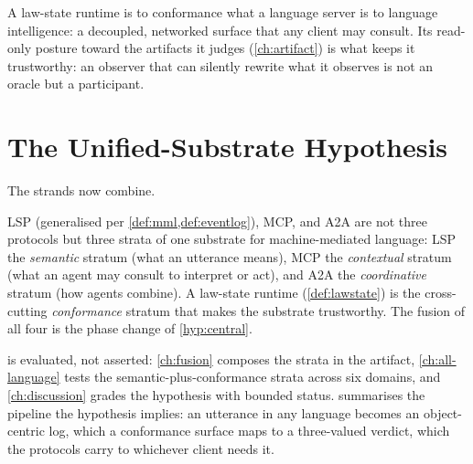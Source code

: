 A law-state runtime is to conformance what a language server is to language
intelligence: a decoupled, networked surface that any client may consult. Its
read-only posture toward the artifacts it judges (\cref{ch:artifact}) is what
keeps it trustworthy: an observer that can silently rewrite what it observes is
not an oracle but a participant.

\section{The Unified-Substrate Hypothesis}
\label{sec:fw-substrate}

The strands now combine.

\begin{hypothesis}
\label{hyp:substrate}
LSP (generalised per \cref{def:mml,def:eventlog}), MCP, and A2A are not three
protocols but three strata of one substrate for machine-mediated language: LSP
the \emph{semantic} stratum (what an utterance means), MCP the \emph{contextual}
stratum (what an agent may consult to interpret or act), and A2A the
\emph{coordinative} stratum (how agents combine). A law-state runtime
(\cref{def:lawstate}) is the cross-cutting \emph{conformance} stratum that makes
the substrate trustworthy. The fusion of all four is the phase change of
\cref{hyp:central}.
\end{hypothesis}

 is evaluated, not asserted: \cref{ch:fusion} composes the
strata in the artifact, \cref{ch:all-language} tests the semantic-plus-conformance
strata across six domains, and \cref{ch:discussion} grades the hypothesis with
bounded status.  summarises the pipeline the hypothesis
implies: an utterance in any language becomes an object-centric log, which a
conformance surface maps to a three-valued verdict, which the protocols carry to
whichever client needs it.

